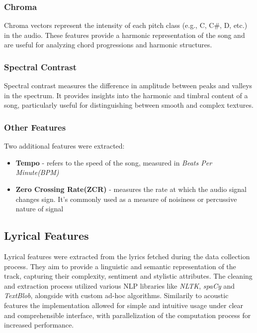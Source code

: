 \subsubsection*{Chroma}
Chroma vectors represent the intensity of each pitch class (e.g., C, C\#, D,
etc.) in the audio. These features provide a harmonic representation of the
song and are useful for analyzing chord progressions and harmonic structures.

\subsubsection*{Spectral Contrast}
Spectral contrast measures the difference in amplitude between peaks and
valleys in the spectrum. It provides insights into the harmonic and timbral
content of a song, particularly useful for distinguishing between smooth and
complex textures.

\subsubsection*{Other Features}
Two additional features were extracted:
\begin{itemize}
  \item \textbf{Tempo} - refers to the speed of the song, measured in
    \textit{Beats Per Minute(BPM)}
  \item \textbf{Zero Crossing Rate(ZCR)} - measures the rate at which the audio
    signal changes sign. It's commonly used as a measure of noisiness or
    percussive nature of signal
\end{itemize}


\subsection{Lyrical Features}
\label{sec:lyricalfeatures}

Lyrical features  were extracted from the lyrics fetched during the data
collection process. They aim to provide a linguistic and semantic
representation of the track, capturing their complexity, sentiment and
stylistic  attributes. The cleaning and extraction  process utilized various
NLP libraries like \textit{NLTK}, \textit{spaCy} and \textit{TextBlob},
alongside with custom ad-hoc algorithms. Similarily to acoustic features the
implementation allowed for simple and intuitive usage under clear and
comprehensible interface, with parallelization of the computation process for
increased performance. \cite{nltk} \cite{spacy} \cite{textblob}


